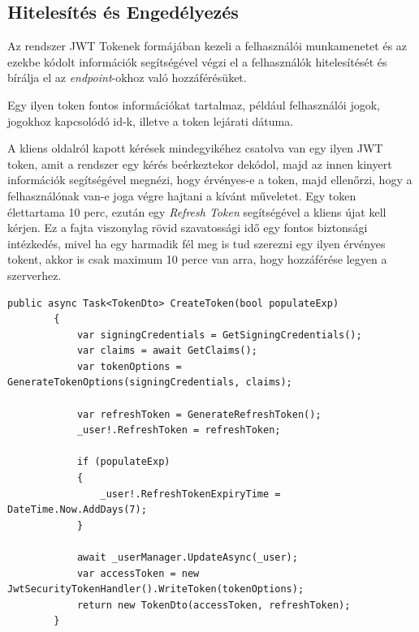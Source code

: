 \subsection{Hitelesítés és Engedélyezés}

Az rendszer JWT Tokenek\cite{jwtdocs} formájában kezeli a felhasználói munkamenetet és az ezekbe kódolt információk segítségével végzi el a felhasználók hitelesítését és bírálja el az \textit{endpoint}-okhoz való hozzáférésüket.

Egy ilyen token fontos információkat tartalmaz, például felhasználói jogok, jogokhoz kapcsolódó id-k, illetve a token lejárati dátuma. 

A kliens oldalról kapott kérések mindegyikéhez csatolva van egy ilyen JWT token, amit a rendszer egy kérés beérkeztekor dekódol, majd az innen kinyert információk segítségével megnézi, hogy érvényes-e a token, majd ellenőrzi, hogy a felhasználónak van-e joga végre hajtani a kívánt műveletet. Egy token élettartama 10 perc, ezután egy \textit{Refresh Token} segítségével a kliens újat kell kérjen. Ez a fajta viszonylag rövid szavatossági idő egy fontos biztonsági intézkedés, mivel ha egy harmadik fél meg is tud szerezni egy ilyen érvényes tokent, akkor is csak maximum 10 perce van arra, hogy hozzáférése legyen a szerverhez. 

\begin{lstlisting}[caption={Egy JWT token felépítése a szerver oldalon}, label={lst:create_token_example}]
  public async Task<TokenDto> CreateToken(bool populateExp)
        {
            var signingCredentials = GetSigningCredentials();
            var claims = await GetClaims();
            var tokenOptions = GenerateTokenOptions(signingCredentials, claims);

            var refreshToken = GenerateRefreshToken();
            _user!.RefreshToken = refreshToken;

            if (populateExp)
            {
                _user!.RefreshTokenExpiryTime = DateTime.Now.AddDays(7);
            }

            await _userManager.UpdateAsync(_user);
            var accessToken = new JwtSecurityTokenHandler().WriteToken(tokenOptions);
            return new TokenDto(accessToken, refreshToken); 
        }
\end{lstlisting}

